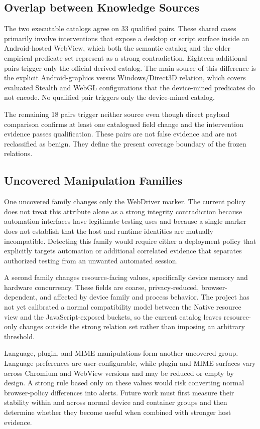 \subsection{Overlap between Knowledge Sources}

The two executable catalogs agree on 33 qualified pairs. These shared cases primarily involve interventions that expose a desktop or script surface inside an Android-hosted WebView, which both the semantic catalog and the older empirical predicate set represent as a strong contradiction. Eighteen additional pairs trigger only the official-derived catalog. The main source of this difference is the explicit Android-graphics versus Windows/Direct3D relation, which covers evaluated Stealth and WebGL configurations that the device-mined predicates do not encode. No qualified pair triggers only the device-mined catalog.

The remaining 18 pairs trigger neither source even though direct payload comparison confirms at least one catalogued field change and the intervention evidence passes qualification. These pairs are not false evidence and are not reclassified as benign. They define the present coverage boundary of the frozen relations.

\subsection{Uncovered Manipulation Families}

One uncovered family changes only the WebDriver marker. The current policy does not treat this attribute alone as a strong integrity contradiction because automation interfaces have legitimate testing uses and because a single marker does not establish that the host and runtime identities are mutually incompatible. Detecting this family would require either a deployment policy that explicitly targets automation or additional correlated evidence that separates authorized testing from an unwanted automated session.

A second family changes resource-facing values, specifically device memory and hardware concurrency. These fields are coarse, privacy-reduced, browser-dependent, and affected by device family and process behavior. The project has not yet calibrated a normal compatibility model between the Native resource view and the JavaScript-exposed buckets, so the current catalog leaves resource-only changes outside the strong relation set rather than imposing an arbitrary threshold.

Language, plugin, and MIME manipulations form another uncovered group. Language preferences are user-configurable, while plugin and MIME surfaces vary across Chromium and WebView versions and may be reduced or empty by design. A strong rule based only on these values would risk converting normal browser-policy differences into alerts. Future work must first measure their stability within and across normal device and container groups and then determine whether they become useful when combined with stronger host evidence.

